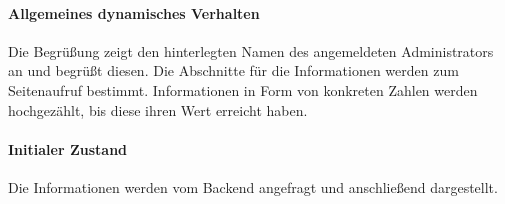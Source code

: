 \paragraph*{Allgemeines dynamisches Verhalten}
Die Begrüßung zeigt den hinterlegten Namen des angemeldeten Administrators an und begrüßt diesen.
Die Abschnitte für die Informationen werden zum Seitenaufruf bestimmt. 
Informationen in Form von konkreten Zahlen werden hochgezählt, bis diese ihren Wert erreicht haben.

\paragraph*{Initialer Zustand}
Die Informationen werden vom Backend angefragt und anschließend dargestellt.
